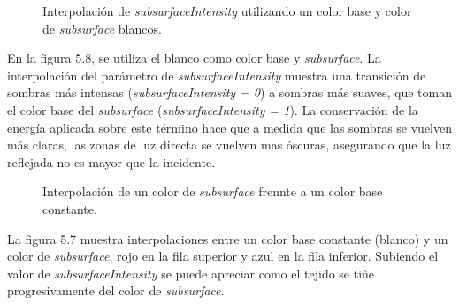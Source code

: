 \begin{figure}[H]
  \vspace{0.5cm}
  \centering
    \caption{Interpolaci\'on de \textit{subsurfaceIntensity} utilizando un color base y color de \textit{subsurface} blancos.}
\end{figure}
\singlespacing

En la figura 5.8, se utiliza el blanco como color base y \textit{subsurface}. La interpolaci\'on del par\'ametro de \textit{subsurfaceIntensity}
muestra una transici\'on de sombras m\'as intensas (\textit{subsurfaceIntensity = 0}) a sombras m\'as suaves, que toman el color base del
\textit{subsurface} (\textit{subsurfaceIntensity = 1}). La conservaci\'on de la energ\'ia aplicada sobre este t\'ermino
hace que a medida que las sombras se vuelven m\'as claras, las zonas de luz directa se vuelven mas \'oscuras, asegurando
que la luz reflejada no es mayor que la incidente.\\



\begin{figure}[H]
  \vspace{0.5cm}
  \centering
    \caption{Interpolaci\'on de un color de \textit{subsurface} frennte a un color base constante.}
 \end{figure}
\singlespacing

La figura 5.7 muestra interpolaciones entre un color base constante (blanco) y un color de \textit{subsurface},
rojo en la fila superior y azul en la fila inferior. Subiendo el valor de \textit{subsurfaceIntensity}
se puede apreciar como el tejido se ti\~ne progresivamente del color de \textit{subsurface}.


